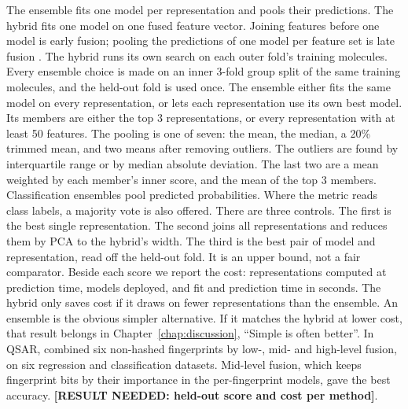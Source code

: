 The ensemble fits one model per representation and pools their predictions. The hybrid fits one model on one fused feature vector. Joining features before one model is early fusion; pooling the predictions of one model per feature set is late fusion \citep{Stahlschmidt2022}. The hybrid runs its own search on each outer fold's training molecules. Every ensemble choice is made on an inner 3-fold group split of the same training molecules, and the held-out fold is used once. The ensemble either fits the same model on every representation, or lets each representation use its own best model. Its members are either the top 3 representations, or every representation with at least 50 features. The pooling is one of seven: the mean, the median, a 20\% trimmed mean, and two means after removing outliers. The outliers are found by interquartile range or by median absolute deviation. The last two are a mean weighted by each member's inner score, and the mean of the top 3 members. Classification ensembles pool predicted probabilities. Where the metric reads class labels, a majority vote is also offered. There are three controls. The first is the best single representation. The second joins all representations and reduces them by PCA to the hybrid's width. The third is the best pair of model and representation, read off the held-out fold. It is an upper bound, not a fair comparator. Beside each score we report the cost: representations computed at prediction time, models deployed, and fit and prediction time in seconds. The hybrid only saves cost if it draws on fewer representations than the ensemble. An ensemble is the obvious simpler alternative. If it matches the hybrid at lower cost, that result belongs in Chapter~\ref{chap:discussion}, ``Simple is often better''. In QSAR, \citet{Turkina2025} combined six non-hashed fingerprints by low-, mid- and high-level fusion, on six regression and classification datasets. Mid-level fusion, which keeps fingerprint bits by their importance in the per-fingerprint models, gave the best accuracy. \textbf{[RESULT NEEDED: held-out score and cost per method]}.

